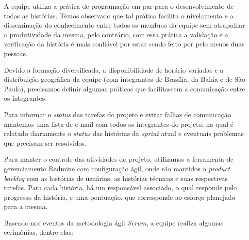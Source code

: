
A equipe utiliza a prática de programação em par para o desenvolvimento de todas as histórias. Temos observado que tal prática facilita o nivelamento e a disseminação do conhecimento entre todos os membros da equipe sem atrapalhar a produtividade da mesma, pelo contrário, com essa prática a validação e a verificação da história é mais confiável por estar sendo feito por pelo menos duas pessoas.



Devido a formação diversificada, a disponibilidade de horário variadas e a distribuição geográfica da equipe (com integrantes de Brasília, da Bahia e de São Paulo), precisamos definir algumas práticas que facilitassem a comunicação entre os integrantes. 

Para informar o \textit{status} das tarefas do projeto e evitar falhas de comunicação mantemos uma lista de e-mail com todos os integrantes do projeto, na qual é relatado diariamente o \textit{status} das histórias da \textit{sprint} atual e eventuais problemas que precisam ser resolvidos. 

Para manter o controle das atividades do projeto, utilizamos a ferramenta de gerenciamento Redmine com configuração ágil, onde são mantidos o \textit{product backlog} com as histórias de usuários, as histórias técnicas e suas respectivas tarefas. Para cada história, há um responsável associado, o qual responde pelo progresso da história, e uma pontuação, que corresponde ao esforço planejado para a mesma.



Baseado nos eventos da metodologia ágil \textit{Scrum}, a equipe realiza algumas cerimônias, dentre elas:

